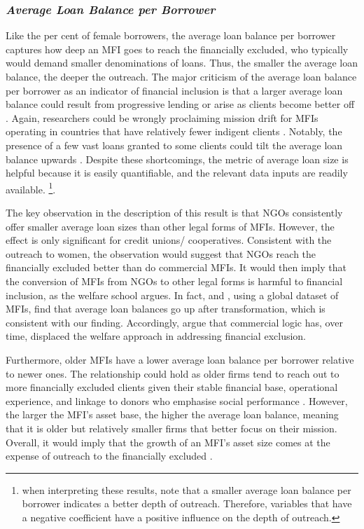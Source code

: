 \documentclass[a4paper,nobind]{templates/ociamthesis}
\begin{document}
\hypertarget{average-loan-balance-per-borrower}{%
\subsubsection{\texorpdfstring{\textbf{\emph{Average Loan Balance per Borrower}}}{Average Loan Balance per Borrower}}\label{average-loan-balance-per-borrower}}

Like the per cent of female borrowers, the average loan balance per borrower captures how deep an MFI goes to reach the financially excluded, who typically would demand smaller denominations of loans. Thus, the smaller the average loan balance, the deeper the outreach. The major criticism of the average loan balance per borrower as an indicator of financial inclusion is that a larger average loan balance could result from progressive lending or arise as clients become better off \autocite{abeysekera2014sustainability}. Again, researchers could be wrongly proclaiming mission drift for MFIs operating in countries that have relatively fewer indigent clients \autocite{armendariz2013subsidy}. Notably, the presence of a few vast loans granted to some clients could tilt the average loan balance upwards \autocite{market2014global}. Despite these shortcomings, the metric of average loan size is helpful because it is easily quantifiable, and the relevant data inputs are readily available. \footnote{when interpreting these results, note that a smaller average loan balance per borrower indicates a better depth of outreach. Therefore, variables that have a negative coefficient have a positive influence on the depth of outreach.}.

The key observation in the description of this result is that NGOs consistently offer smaller average loan sizes than other legal forms of MFIs. However, the effect is only significant for credit unions/ cooperatives. Consistent with the outreach to women, the observation would suggest that NGOs reach the financially excluded better than do commercial MFIs. It would then imply that the conversion of MFIs from NGOs to other legal forms is harmful to financial inclusion, as the welfare school argues. In fact, \textcite{d2017ngos} and \textcite{mia2017mission}, using a global dataset of MFIs, find that average loan balances go up after transformation, which is consistent with our finding. Accordingly, \textcite{peck2001commercialization} argue that commercial logic has, over time, displaced the welfare approach in addressing financial exclusion.

Furthermore, older MFIs have a lower average loan balance per borrower relative to newer ones. The relationship could hold as older firms tend to reach out to more financially excluded clients given their stable financial base, operational experience, and linkage to donors who emphasise social performance \autocite{bos2015practice}. However, the larger the MFI's asset base, the higher the average loan balance, meaning that it is older but relatively smaller firms that better focus on their mission. Overall, it would imply that the growth of an MFI's asset size comes at the expense of outreach to the financially excluded \autocite{armendariz2013subsidy}.
\end{document}
